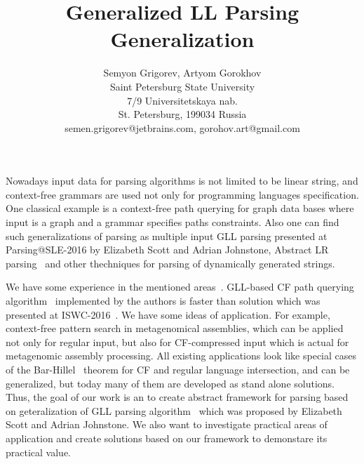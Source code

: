 \documentclass[12pt]{article}  %
\title{Generalized LL Parsing Generalization}
\author{Semyon Grigorev, Artyom Gorokhov
\\
       {Saint Petersburg State University}\\
       {7/9 Universitetskaya nab.}\\
       {St. Petersburg, 199034 Russia}\\
       semen.grigorev@jetbrains.com, gorohov.art@gmail.com
       }
\date{}
\theoremstyle{definition}
\theoremstyle{remark}
\begin{document}
\maketitle

Nowadays input data for parsing algorithms is not limited to be linear string, and context-free grammars are used not only for programming languages specification.
One classical example is a context-free path querying for graph data bases where input is a graph and a grammar specifies paths constraints.
Also one can find such generalizations of parsing as multiple input GLL parsing presented at Parsing@SLE-2016 by Elizabeth Scott and Adrian Johnstone, 
Abstract LR parsing~\cite{AbstractParsing} and other thechniques for parsing of dynamically generated strings.

We have some experience in the mentioned areas~\cite{GraphGLL, RelaxedRNGLR}.
GLL-based CF path querying algorithm~\cite{GraphGLL} implemented by the authors is faster than solution which was presented at ISWC-2016~\cite{CFRDFParsing}. 
We have some ideas of application.
For example, context-free pattern search in metagenomical assemblies, which can be applied not only for regular input, but also for CF-compressed input which is actual for metagenomic assembly processing. 
All existing applications look like special cases of the Bar-Hillel~\cite{Bar-Hillel} theorem for CF and regular language intersection, and can be generalized, but today many of them are developed as stand alone solutions.
Thus, the goal of our work is an to create abstract framework for parsing based on geteralization of GLL parsing algorithm~\cite{GLL} which was proposed by Elizabeth Scott and Adrian Johnstone. 
We also want to investigate practical areas of application and create solutions based on our framework to demonstare its practical value.
\end{document}
